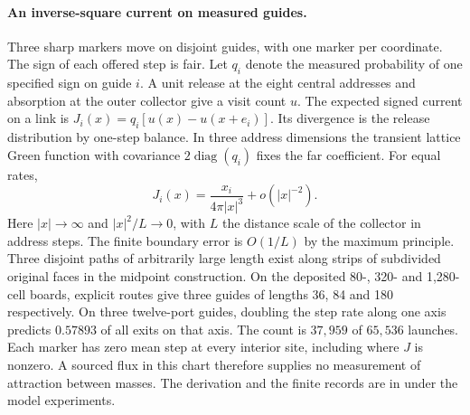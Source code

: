 \documentclass[11pt]{article}
\begin{document}
\paragraph{An inverse-square current on measured guides.}
Three sharp markers move on disjoint guides, with one marker per coordinate.
The sign of each offered step is fair. Let $q_i$ denote the measured
probability of one specified sign on guide $i$.
A unit release at the eight central addresses and absorption at the outer
collector give a visit count $u$. The expected signed current on a link is
$J_i(x)=q_i[u(x)-u(x+e_i)]$. Its divergence is the release distribution
by one-step balance. In three address dimensions the transient lattice
Green function with covariance $2\operatorname{diag}(q_i)$ fixes the
far coefficient. For equal rates,
\[
  J_i(x)=\frac{x_i}{4\pi |x|^3}+o(|x|^{-2}).
\]
Here $|x|\to\infty$ and $|x|^2/L\to0$, with $L$ the distance scale
of the collector in address steps. The finite boundary error is
$O(1/L)$ by the maximum principle. Three disjoint paths of arbitrarily
large length exist along strips of subdivided original faces in the
midpoint construction. On the deposited 80-, 320- and 1,280-cell boards,
explicit routes give three guides of lengths 36, 84 and 180 respectively.
On three twelve-port guides, doubling the
step rate along one axis predicts $0.57893$ of all exits on that axis.
The count is $37{,}959$ of $65{,}536$ launches. Each marker has zero
mean step at every interior site, including where $J$ is nonzero.
A sourced flux in this chart therefore supplies no measurement of
attraction between masses.
The derivation and the finite records are in
under the model experiments.
\end{document}
